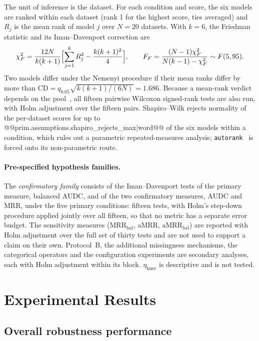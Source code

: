 \documentclass[pdflatex,sn-mathphys]{sn-jnl}
\theoremstyle{thmstyleone}
\theoremstyle{thmstyletwo}
\theoremstyle{thmstylethree}
\newcommand{\MRR}{\mathrm{MRR}}
\newcommand{\aMRR}{\mathrm{aMRR}}
\newcommand{\etaknee}{\eta_{\mathrm{knee}}}
\begin{document}
The unit of inference is the dataset. For each condition and score, the six models are ranked within each dataset (rank 1 for the highest score, ties averaged) and $R_j$ is the mean rank of model $j$ over $N=20$ datasets. With $k=6$, the Friedman statistic and its Iman--Davenport correction are
\begin{equation}\label{eq:friedman}
\chi^{2}_{F}=\frac{12N}{k(k+1)}\Bigl[\sum_{j=1}^{k}R_j^{2}-\frac{k(k+1)^{2}}{4}\Bigr],\qquad
F_F=\frac{(N-1)\chi^{2}_{F}}{N(k-1)-\chi^{2}_{F}}\sim F(5,95).
\end{equation}
Two models differ under the Nemenyi procedure if their mean ranks differ by more than $\mathrm{CD}=q_{0.05}\sqrt{k(k+1)/(6N)}=1.686$. Because a mean-rank verdict depends on the pool~\cite{benavoli2016should}, all fifteen pairwise Wilcoxon signed-rank tests are also run, with Holm adjustment over the fifteen pairs. Shapiro--Wilk rejects normality of the per-dataset scores for up to @@{prim.assumptions.shapiro_rejects_max|word}@@ of the six models within a condition, which rules out a parametric repeated-measures analysis; \texttt{autorank}~\cite{herbold2020autorank} is forced onto its non-parametric route.

\paragraph{Pre-specified hypothesis families.} The \emph{confirmatory family} consists of the Iman--Davenport tests of the primary measure, balanced AUDC, and of the two confirmatory measures, AUDC and MRR, under the five primary conditions: fifteen tests, with Holm's step-down procedure applied jointly over all fifteen, so that no metric has a separate error budget. The sensitivity measures ($\MRR_{\mathrm{bal}}$, aMRR, $\aMRR_{\mathrm{bal}}$) are reported with Holm adjustment over the full set of thirty tests and are not used to support a claim on their own. Protocol~B, the additional missingness mechanisms, the categorical operators and the configuration experiments are secondary analyses, each with Holm adjustment within its block. $\etaknee$ is descriptive and is not tested.

\section{Experimental Results}\label{sec:results}

\subsection{Overall robustness performance}\label{sec:res:overall}
\end{document}
